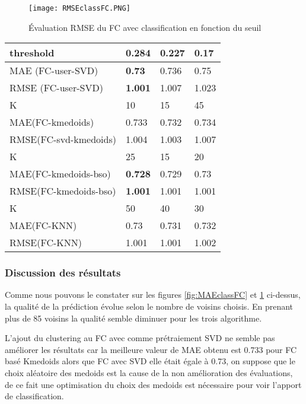 \begin{figure}[H]
		\centering
	\texttt{[image: RMSEclassFC.PNG]}
	\caption{Évaluation RMSE du FC avec classification en fonction du seuil}
	\label{fig:RMSEclassFC}
\end{figure}
\begin{table}[H]
	\centering
	\begin{tabular}{|l|l|l|l|}
		\hline
		threshold & 0.284 & 0.227 & 0.17 \\ \hline
		MAE  (FC-user-SVD) & \textbf{0.73} & 0.736 & 0.75\\ \hline
		RMSE (FC-user-SVD) & \textbf{1.001} & 1.007 & 1.023 \\\hline \hline
		K & 10 & 15 & 45 \\ \hline
		MAE(FC-kmedoids) & 0.733 & 0.732 & 0.734 \\ \hline
		RMSE(FC-svd-kmedoids) & 1.004 & 1.003 & 1.007 \\ \hline\hline
		K & 25 & 15 & 20 \\ \hline
		MAE(FC-kmedoids-bso) & \textbf{0.728} & 0.729 & 0.73 \\ \hline
		RMSE(FC-kmedoids-bso) & \textbf{1.001} & 1.001 & 1.001 \\ \hline\hline
		K & 50 & 40 & 30 \\ \hline
		MAE(FC-KNN) & 0.73 & 0.731 & 0.732 \\ \hline
		RMSE(FC-KNN) & 1.001 & 1.001 & 1.002 \\ \hline
	\end{tabular}
\end{table}
\subsubsection*{Discussion des résultats}
Comme nous pouvons le constater sur les figures \ref{fig:MAEclassFC} et \ref{fig:RMSEclassFC} ci-dessus, la qualité de la prédiction évolue selon le nombre de voisins choisis. En prenant plus de 85 voisins la qualité semble diminuer pour les trois algorithme.

L'ajout du clustering au FC avec comme prétraiement SVD ne semble pas améliorer les résultats car la meilleure valeur de MAE obtenu est 0.733 pour FC basé Kmedoids alors que FC avec SVD elle était égale à 0.73, on suppose que le choix aléatoire des medoids est la cause de la non amélioration des évaluations, de ce fait une optimisation du choix des medoids est nécessaire pour voir l'apport de classification.

